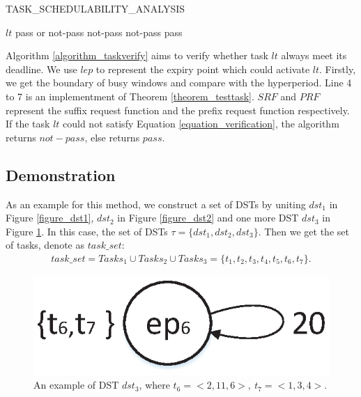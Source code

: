 \documentclass[sigconf]{acmart}
\begin{document}
\begin{algorithm}
  \caption{TASK\_SCHEDULABILITY\_ANALYSIS}
  \label{algorithm_taskverify}
  \begin{algorithmic}[1]
    \REQUIRE $lt$
    \ENSURE pass or not-pass
    \STATE \Return not-pass
    \ELSE
    \STATE \Return not-pass
    \ENDIF
    \ENDFOR
    \ENDFOR
    \ENDFOR
    \STATE \Return pass
    \ENDIF
  \end{algorithmic}
\end{algorithm}

Algorithm \ref{algorithm_taskverify} aims to verify whether task $lt$ always meet its deadline. We use $lep$ to represent the expiry point which could activate $lt$. Firstly, we get the boundary of busy windows and compare with the hyperperiod. Line 4 to 7 is an implementment of Theorem \ref{theorem_testtask}. $SRF$ and $PRF$ represent the suffix request function and the prefix request function respectively. If the task $lt$ could not satisfy Equation \ref{equation_verification}, the algorithm returns $not-pass$, else returns $pass$.

\subsection{Demonstration}\label{section_demonstration}
As an example for this method, we construct a set of DSTs by uniting $dst_1$ in Figure \ref{figure_dst1}, $dst_2$ in Figure \ref{figure_dst2} and one more DST $dst_3$ in Figure \ref{figure_dst3}. In this case, the set of DSTs $\tau =\{dst_1,dst_2,dst_3\}$. Then we get the set of tasks, denote as $task\_set$: 
\[\begin{split}
task\_set=Tasks_1\cup Tasks_2\cup Tasks_3=\{t_1,t_2,t_3,t_4,t_5,t_6,t_7\}.
\end{split}\]

\begin{figure}
  \centering
  \includegraphics[scale=.4]{graphics/figure_dst3.eps}
  \caption{An example of DST $dst_3$, where $t_6=<2,11,6>,\ t_7=<1,3,4>$.} 
  \label{figure_dst3}
\end{figure}
\end{document}
